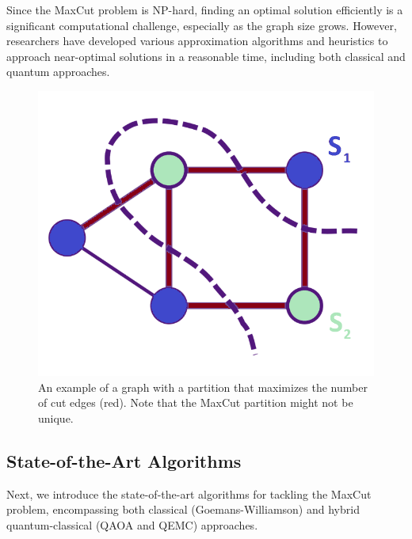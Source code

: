 Since the MaxCut problem is NP-hard, finding an optimal solution efficiently is a significant computational challenge, especially as the graph size grows. However, researchers have developed various approximation algorithms and heuristics to approach near-optimal solutions in a reasonable time, including both classical and quantum approaches. %
 

\begin{figure}[H]
  \centering
  \includegraphics[width=1\columnwidth]{Figures/MaxCut.png}
  \caption{An example of a graph with a partition that maximizes the number of cut edges (red). Note that the MaxCut partition might not be unique.} %
  \label{fig:MaxCut}
\end{figure}

\subsection{State-of-the-Art Algorithms}
\label{sec: SoA}
Next, we introduce the state-of-the-art algorithms for tackling the MaxCut problem, encompassing both classical (Goemans-Williamson) and hybrid quantum-classical (QAOA and QEMC) approaches.

